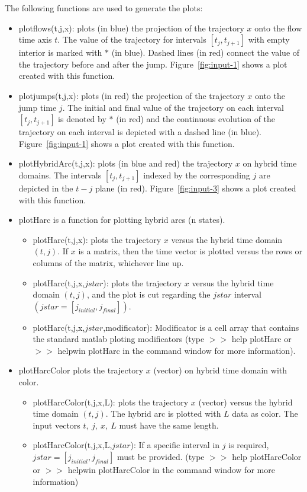 \documentclass{article}
\begin{document}
\noindent The following functions are used to generate the plots:
\begin{itemize}
\item plotflows(t,j,x): plots (in blue) the projection of the
  trajectory $x$ onto the flow time axis $t$.  The value of the
  trajectory for intervals $[t_j,t_{j+1}]$ with empty interior is
  marked with $*$ (in blue).  Dashed lines (in red) connect the value of the
  trajectory before and after the jump. Figure~\ref{fig:input-1} shows a plot created with this function.
\item plotjumps(t,j,x): plots (in red) the projection of the
  trajectory $x$ onto the jump time $j$. The initial and final value
  of the trajectory on each interval $[t_j,t_{j+1}]$ is denoted by
  $*$ (in red) and the continuous evolution of the trajectory on
  each interval is depicted with a dashed line (in blue). Figure~\ref{fig:input-1} shows a plot created with this function.
\item plotHybridArc(t,j,x): plots (in blue and red) the trajectory $x$ on hybrid
time domains. The intervals $[t_j,t_{j+1}]$ indexed by the
corresponding $j$ are depicted in the $t-j$ plane (in red). Figure~\ref{fig:input-3} shows a plot created with this function.
\item plotHarc is a function for plotting hybrid arcs (n states).
\begin{itemize}
\item plotHarc(t,j,x): plots the trajectory $x$ versus the hybrid time domain $(t,j)$. If $x$ is a matrix, then the time vector is plotted versus the rows or columns of the matrix, whichever line up.
\item plotHarc(t,j,x,$jstar$): plots the trajectory $x$ versus the hybrid time domain $(t,j)$, and the plot is cut regarding the $jstar$ interval $(jstar = [j_{initial},j_{final}])$.
\item plotHarc(t,j,x,$jstar$,modificator): Modificator is a cell array that contains the standard matlab ploting modificators (type $>>$ help plotHarc or $>>$ helpwin plotHarc in the command window for more information).
\end{itemize}

\item plotHarcColor plots the trajectory $x$ (vector) on hybrid time domain with color.
\begin{itemize}
\item plotHarcColor(t,j,x,L): plots the trajectory $x$ (vector) versus the hybrid time domain $(t,j)$. The hybrid arc is plotted with $L$ data as color. The input vectors $t,\ j,\ x,\ L$ must have the same length. 
\item      plotHarcColor(t,j,x,L,$jstar$): If a specific interval in $j$ is required, $jstar = [j_{initial},
 j_{final}]$ must be provided. (type $>>$ help plotHarcColor or $>>$ helpwin plotHarcColor in the command window for more information)
\end{itemize}


\end{itemize}
\end{document}

